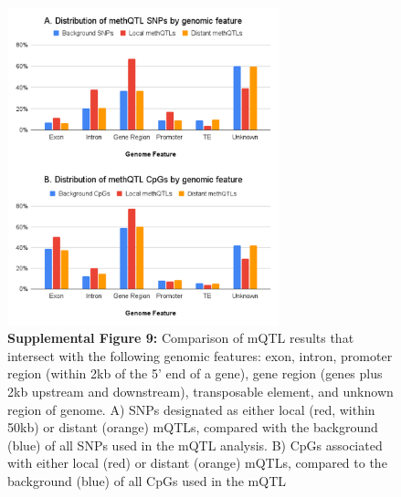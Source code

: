 \documentclass[
]{article}
\begin{document}
\begin{figure}
\centering
\includegraphics[width=0.7\textwidth,height=\textheight]{../supplemental-files/Supp-09.png}
\caption{\textbf{Supplemental Figure 9:} Comparison of mQTL results that
intersect with the following genomic features: exon, intron, promoter
region (within 2kb of the 5' end of a gene), gene region (genes plus 2kb
upstream and downstream), transposable element, and unknown region of
genome. A) SNPs designated as either local (red, within 50kb) or distant
(orange) mQTLs, compared with the background (blue) of all SNPs used in
the mQTL analysis. B) CpGs associated with either local (red) or distant
(orange) mQTLs, compared to the background (blue) of all CpGs used in
the mQTL}
\end{figure}
\end{document}
